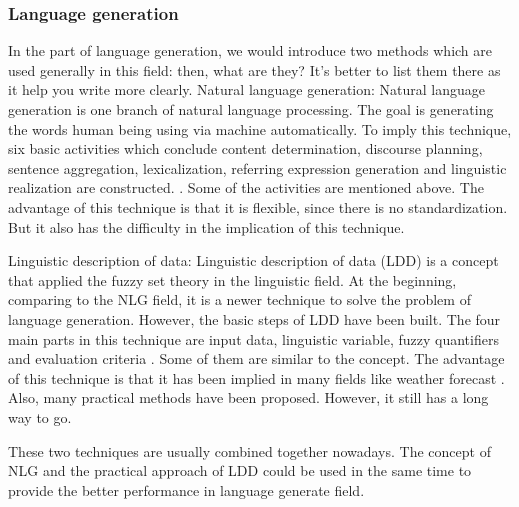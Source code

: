 \subsubsection*{Language generation}
In the part of language generation, we would introduce two methods which are used generally in this field: then, what are they? It's better to list them there as it help you write more clearly.
Natural language generation: Natural language generation is one branch of natural language processing. The goal is generating the words human being using via machine automatically. To imply this technique, six basic activities which conclude content determination, discourse planning, sentence aggregation, lexicalization, referring expression generation and linguistic realization are constructed. \cite{Ramos-Soto2015}. Some of the activities are mentioned above. The advantage of this technique is that it is flexible, since there is no standardization. But it also has the difficulty in the implication of this technique.\cite{Ramos-Soto2015}

Linguistic description of data: Linguistic description of data (LDD) is a concept that applied the fuzzy set theory in the linguistic field. At the beginning, comparing to the NLG field, it is a newer technique to solve the problem of language generation. However, the basic steps of LDD have been built. The four main parts in this technique are input data, linguistic variable, fuzzy quantifiers and evaluation criteria \cite{Ramos-Soto2015}. Some of them are similar to the concept. The advantage of this technique is that it has been implied in many fields like weather forecast \cite{Tamine2009}. Also, many practical methods have been proposed. However, it still has a long way to go.

These two techniques are usually combined together nowadays. The concept of NLG and the practical approach of LDD could be used in the same time to provide the better performance in language generate field.

\newpage %